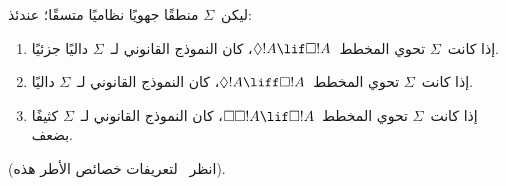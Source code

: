 \documentclass[../../../include/open-logic-section]{subfiles}
\begin{document}
\begin{prop}
  ليكن~$\Sigma$ منطقًا جهويًا نظاميًا متسقًا؛ عندئذ:
  \begin{enumerate}
  \item{}%
    إذا كانت~$\Sigma$ تحوي المخطط~$\Diamond!A \lif \Box !A$، كان
    النموذج القانوني لـ~$\Sigma$ داليًا جزئيًا.
  \item إذا كانت~$\Sigma$ تحوي المخطط~$\Diamond!A \liff \Box !A$،
    كان النموذج القانوني لـ~$\Sigma$ داليًا.
  \item إذا كانت~$\Sigma$ تحوي المخطط~$\Box\Box!A \lif \Box !A$،
    كان النموذج القانوني لـ~$\Sigma$ كثيفًا بضعف.
  \end{enumerate}
(انظر~ لتعريفات خصائص الأطر هذه).
\end{prop}
\end{document}
